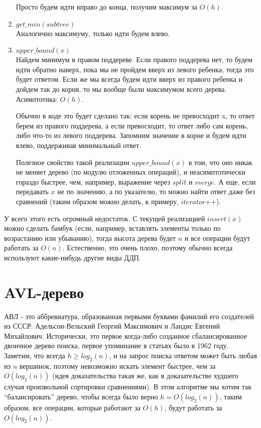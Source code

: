 \begin{enumerate}
    Просто будем идти вправо до конца, получим максимум за $O(h)$.
    \item $get\_min(subtree)$ \\ 
    Аналогично максимуму, только идти будем влево.
    \item $upper\_bound(x)$ \\
    Найдем минимум в правом поддереве. Если правого поддерева нет, то будем идти обратно наверх, пока мы не пройдем вверх из левого ребенка, тогда это будет ответом. Если же мы всегда будем идти вверх из правого ребенка и дойдем так до корня, то мы вообще были максимумом всего дерева. Асимптотика: $O(h)$.
    \begin{note}
    Обычно в коде это будет сделано так: если корень не превосходит x, то ответ берем из правого поддерева, а если превосходит, то ответ либо сам корень, либо что-то из левого поддерева. Запомним значение в корне и будем идти влево, поддерживая минимальный ответ.
    \end{note}
    Полезное свойство такой реализации $upper\_bound(x)$ в том, что оно никак не меняет дерево (по модулю отложенных операций), и неасимптотически гораздо быстрее, чем, например, выражение через $split$ и $merge$. А еще, если передавать $x$ не по значению, а по указателю, то можно найти ответ даже без сравнений (таким образом можно делать, к примеру, $iterator$++).
\end{enumerate}
У всего этого есть огромный недостаток. С текущей реализацией $insert(x)$ можно сделать бамбук (если, например, вставлять элементы только по возрастанию или убыванию), тогда высота дерева будет $n$ и все операции будут работать за $O(n)$. Естественно, это очень плохо, поэтому обычно всегда используют какие-нибудь другие виды ДДП.



\section{AVL-дерево}



АВЛ - это аббревиатура, образованная первыми буквами фамилий его создателей из СССР: Адельсон-Вельский Георгий Максимович и Ландис Евгений Михайлович. Исторически, это первое когда-либо созданное сбалансированное двоичное дерево поиска, первое упоминание в статьях было в 1962 году. \\
Заметим, что всегда $h \geq log_2(n)$, и на запрос поиска ответом может быть любая из $n$ вершинок, поэтому невозможно искать элемент быстрее, чем за $O(log_2(n))$ (идея доказательства такая же, как в доказательстве худшего случая произвольной сортировки сравнениями). В этом алгоритме мы хотим так ``балансировать'' дерево, чтобы всегда было верно $h = O(log_2(n))$, таким образом, все операции, которые работают за $O(h)$, будут работать за $O(log_2(n))$.

